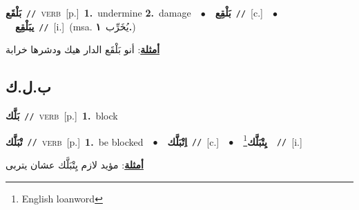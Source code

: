 \documentclass[10pt,a4paper,twoside]{article} %
\begin{document}
\begin{multicols}{2}
{\setlength\topsep{0pt}\textbf{\foreignlanguage{arabic}{بَلْقَع}}\ {\color{gray}\texttt{//}\color{black}}\ \textsc{verb}\ [p.]\ \textbf{1.}~undermine  \textbf{2.}~damage\ \ $\bullet$\ \ \setlength\topsep{0pt}\textbf{\foreignlanguage{arabic}{بَلْقِع}}\ {\color{gray}\texttt{//}\color{black}}\ [c.]\ \ $\bullet$\ \ \setlength\topsep{0pt}\textbf{\foreignlanguage{arabic}{يبَلْقِع}}\ {\color{gray}\texttt{//}\color{black}}\ [i.]\ \color{gray}(msa. \foreignlanguage{arabic}{يُخَرِّب}~\foreignlanguage{arabic}{\textbf{١.}})\color{black}\  \begin{flushright}\color{gray}\foreignlanguage{arabic}{\textbf{\underline{\foreignlanguage{arabic}{أمثلة}}}: أنو بَلْقَع الدار هيك ودشرها خرابة}\end{flushright}\color{black}} \vspace{2mm}

\vspace{-3mm}
\subsection*{\color{blue}\foreignlanguage{arabic}{ب.ل.ك}\color{blue}{}} 

{\setlength\topsep{0pt}\textbf{\foreignlanguage{arabic}{بَلَّك}}\ {\color{gray}\texttt{//}\color{black}}\ \textsc{verb}\ [p.]\ \textbf{1.}~block\ } \vspace{2mm}

{\setlength\topsep{0pt}\textbf{\foreignlanguage{arabic}{تْبَلَّك}}\ {\color{gray}\texttt{//}\color{black}}\ \textsc{verb}\ [p.]\ \textbf{1.}~be blocked\ \ $\bullet$\ \ \setlength\topsep{0pt}\textbf{\foreignlanguage{arabic}{اِتْبَلَّك}}\ {\color{gray}\texttt{//}\color{black}}\ [c.]\ \ $\bullet$\ \ \setlength\topsep{0pt}\textbf{\foreignlanguage{arabic}{يِتْبَلَّك}}\footnote{English loanword}\ \ {\color{gray}\texttt{//}\color{black}}\ [i.]\  \begin{flushright}\color{gray}\foreignlanguage{arabic}{\textbf{\underline{\foreignlanguage{arabic}{أمثلة}}}: مؤيد لازم يِتْبَلَّك عشان يتربى}\end{flushright}\color{black}} \vspace{2mm}


\end{multicols}
\end{document}
